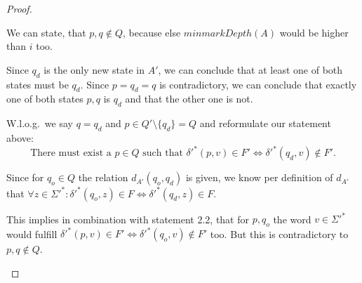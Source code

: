 \documentclass[a4paper, oneside, 11pt]{report}
\newtheorem{lemma}{Lemma}
\theoremstyle{definition}
\theoremstyle{remark}
\begin{document}
\begin{proof}
\begin{description}
		
		We can state, that $p, q \notin Q$, because else $minmarkDepth(A)$ would be higher than $i$ too. 
		
		Since $q_d$ is the only new state in $A'$, we can conclude that at least one of both states must be $q_d$. Since $p = q_d = q$ is contradictory, we can conclude that exactly one of both states $p, q$ is $q_d$ and that the other one is not.
		
		W.l.o.g.\ we say $q = q_d$ and $p \in Q' \setminus \{q_d\} = Q$ and reformulate our statement above:
		\begin{equation}
		\text{There must exist a }p \in Q\text{ such that }\delta'^*(p,v) \in F' \Leftrightarrow \delta'^*(q_d,v) \notin F'.
		\end{equation}
		
		
		Since for $q_o \in Q$ the relation $d_{A'}(q_o, q_d)$ is given, we know per definition of $d_{A'}$ that $\forall z\in\Sigma'^*\colon \delta'^*(q_o,z) \in F \Leftrightarrow \delta'^*(q_d,z) \in F$.
		
		This implies in combination with statement 2.2, that for $p,q_o$ the word $v\in\Sigma'^*$ would fulfill $\delta'^*(p,v) \in F' \Leftrightarrow \delta'^*(q_o,v) \notin F'$ too. But this is contradictory to $p,q \notin Q$.
		
	\end{description}
\end{proof}

%
\end{document}
